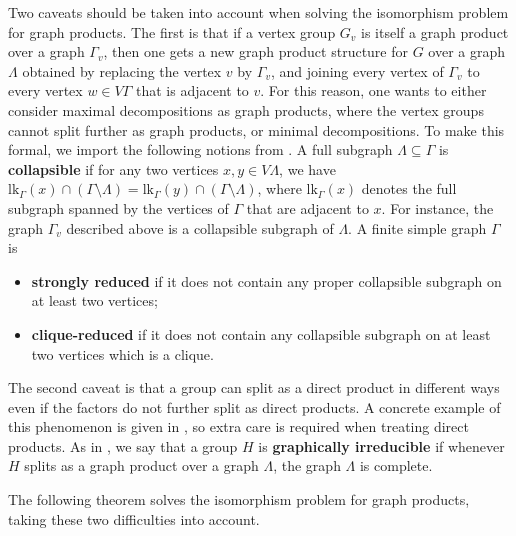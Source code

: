 \documentclass[a4paper,english,11pt]{article}
\theoremstyle{definition}
\theoremstyle{remark}
\newcommand{\lk}{\mathrm{lk}}
\newcommand{\deffont}[1]{\textbf{#1}}
\begin{document}
Two caveats should be taken into account when solving the isomorphism problem for graph products. The first is that if a vertex group $G_v$ is itself a graph product over a graph $\Gamma_v$, then one gets a new graph product structure for $G$ over a graph $\Lambda$ obtained by replacing the vertex $v$ by $\Gamma_v$, and joining every vertex of $\Gamma_v$ to every vertex $w\in V\Gamma$ that is adjacent to $v$. 
For this reason, one wants to either consider maximal decompositions as graph products, where the vertex groups cannot split further as graph products, or minimal decompositions. 
To make this formal, we import the following notions from \cite{EH}. A full subgraph $\Lambda\subseteq\Gamma$ is \deffont{collapsible} if for any two vertices $x,y\in V\Lambda$, we have $\lk_\Gamma(x)\cap (\Gamma\setminus\Lambda)=\lk_\Gamma(y)\cap (\Gamma\setminus\Lambda)$, where $\lk_\Gamma(x)$ denotes the full subgraph spanned by the vertices of $\Gamma$ that are adjacent to $x$. For instance, the graph $\Gamma_v$ described above is a collapsible subgraph of $\Lambda$. A finite simple graph $\Gamma$ is 
\begin{itemize}
    \item \deffont{strongly reduced} if it does not contain any proper collapsible subgraph on at least two vertices;
    \item \deffont{clique-reduced} if it does not contain any collapsible subgraph on at least two vertices which is a clique.
\end{itemize} 
The second caveat is that a group can split as a direct product in different ways even if the factors do not further split as direct products. 
A concrete example of this phenomenon is given in \cite[Chapter XI, pages 81–83]{Kurosh}, so extra care is required when treating direct products. As in \cite{Gen}, we say that a group $H$ is \deffont{graphically irreducible} if whenever $H$ splits as a graph product over a graph $\Lambda$, the graph $\Lambda$ is complete.

The following theorem solves the isomorphism problem for graph products, taking these two difficulties into account.
\end{document}
